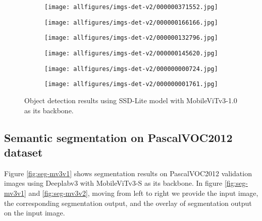 \documentclass{article} \usepackage{iclr2022_conference,times}
\begin{document}
\begin{figure}[ht]
\centering
\begin{subfigure}{.5\textwidth}
  \centering
  \texttt{[image: allfigures/imgs-det-v2/000000371552.jpg]}
\end{subfigure}\hfil
\begin{subfigure}{.5\textwidth}
  \centering
  \texttt{[image: allfigures/imgs-det-v2/000000166166.jpg]}
\end{subfigure}\hfil

\vspace{0.5cm}

\begin{subfigure}{.5\textwidth}
  \centering
  \texttt{[image: allfigures/imgs-det-v2/000000132796.jpg]}
\end{subfigure}\hfil
\begin{subfigure}{.5\textwidth}
  \centering
  \texttt{[image: allfigures/imgs-det-v2/000000145620.jpg]}
\end{subfigure}\hfil

\vspace{0.5cm}

\begin{subfigure}{.5\textwidth}
  \centering
  \texttt{[image: allfigures/imgs-det-v2/000000000724.jpg]}
\end{subfigure}\hfil
\begin{subfigure}{.5\textwidth}
  \centering
  \texttt{[image: allfigures/imgs-det-v2/000000001761.jpg]}
\end{subfigure}\hfil
\caption{Object detection results using SSD-Lite model with MobileViTv3-1.0 as its backbone.}
\label{fig:det-mv3v2}
\end{figure}



\subsection{Semantic segmentation on PascalVOC2012 dataset}

Figure \ref{fig:seg-mv3v1} shows segmentation results on PascalVOC2012 validation images using Deeplabv3 with MobileViTv3-S as its backbone.
In figure \ref{fig:seg-mv3v1} and \ref{fig:seg-mv3v2}, moving from left to right we provide the input image, the corresponding segmentation output, and the overlay of segmentation output on the input image.
\end{document}
